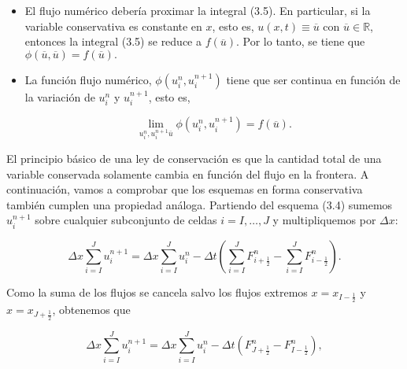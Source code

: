 \begin{itemize}
  \item

        El flujo numérico debería proximar la integral (3.5).
        En particular, si la variable conservativa es constante en
        $x$, esto es, $u\left(x,t\right)\equiv\overline{u}$ con
        $\overline{u}\in\mathbb{R}$, entonces la integral (3.5) se
        reduce a $f\left(\overline{u}\right)$.
        Por lo tanto, se tiene que
        \begin{math}
          \phi
          \left(
          \overline{u},
          \overline{u}
          \right)=
          f\left(\overline{u}\right).
        \end{math}

  \item

        La función flujo numérico,
        \begin{math}
          \phi\left(u^{n}_{i},u^{n+1}_{i}\right)
        \end{math}
        tiene que ser continua en función de la
        variación de $u^{n}_{i}$ y $u^{n+1}_{i}$,
        esto es,

        \begin{equation*}
          \lim_{u^{n}_{i},u^{n+1}_{i}\overline{u}}
          \phi\left(u^{n}_{i},u^{n+1}_{i}\right)=
          f\left(\overline{u}\right).
        \end{equation*}
\end{itemize}

El principio básico de una ley de conservación es que la cantidad
total de una variable conservada solamente cambia en función del
flujo en la frontera.
A continuación, vamos a comprobar que los esquemas en forma
conservativa también cumplen una propiedad análoga.
Partiendo del esquema (3.4) sumemos $u^{n+1}_{i}$ sobre cualquier
subconjunto de celdas $i=I,\dotsc,J$ y multipliquemos por $\Delta x$:

\begin{equation*}
  \Delta x
  \sum_{i=I}^{J}
  u^{n+1}_{i}=
  \Delta x
  \sum_{i=I}^{J}
  u^{n}_{i}-
  \Delta t
  \left(
  \sum_{i=I}^{J}
  F^{n}_{i+\frac{1}{2}}-
  \sum_{i=I}^{J}
  F^{n}_{i-\frac{1}{2}}
  \right).
\end{equation*}

Como la suma de los flujos se cancela salvo los flujos extremos
$x=x_{I-\frac{1}{2}}$ y $x=x_{J+\frac{1}{2}}$, obtenemos que

\begin{equation*}
  \Delta x
  \sum_{i=I}^{J}
  u^{n+1}_{i}=
  \Delta x
  \sum_{i=I}^{J}
  u^{n}_{i}-
  \Delta t
  \left(
  F^{n}_{J+\frac{1}{2}}-
  F^{n}_{I-\frac{1}{2}}
  \right),
\end{equation*}

